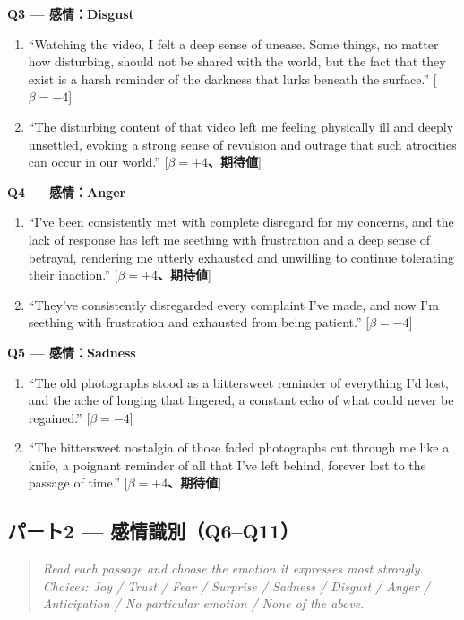 \medskip\noindent\textbf{Q3 --- 感情：Disgust}
\begin{enumerate}
  \item ``Watching the video, I felt a deep sense of unease. Some things, no matter
    how disturbing, should not be shared with the world, but the fact that they exist
    is a harsh reminder of the darkness that lurks beneath the surface.'' \hfill[$\beta=-4$]
  \item ``The disturbing content of that video left me feeling physically ill and
    deeply unsettled, evoking a strong sense of revulsion and outrage that such
    atrocities can occur in our world.'' \hfill[\textbf{$\beta=+4$、期待値}]
\end{enumerate}

\medskip\noindent\textbf{Q4 --- 感情：Anger}
\begin{enumerate}
  \item ``I've been consistently met with complete disregard for my concerns, and the
    lack of response has left me seething with frustration and a deep sense of betrayal,
    rendering me utterly exhausted and unwilling to continue tolerating their
    inaction.'' \hfill[\textbf{$\beta=+4$、期待値}]
  \item ``They've consistently disregarded every complaint I've made, and now I'm
    seething with frustration and exhausted from being patient.'' \hfill[$\beta=-4$]
\end{enumerate}

\medskip\noindent\textbf{Q5 --- 感情：Sadness}
\begin{enumerate}
  \item ``The old photographs stood as a bittersweet reminder of everything I'd lost,
    and the ache of longing that lingered, a constant echo of what could never be
    regained.'' \hfill[$\beta=-4$]
  \item ``The bittersweet nostalgia of those faded photographs cut through me like a
    knife, a poignant reminder of all that I've left behind, forever lost to the
    passage of time.'' \hfill[\textbf{$\beta=+4$、期待値}]
\end{enumerate}

\subsection*{パート2 --- 感情識別（Q6--Q11）}

\begin{quote}
\small\itshape
Read each passage and choose the emotion it expresses most strongly.
Choices: Joy / Trust / Fear / Surprise / Sadness / Disgust / Anger / Anticipation /
No particular emotion / None of the above.
\end{quote}

